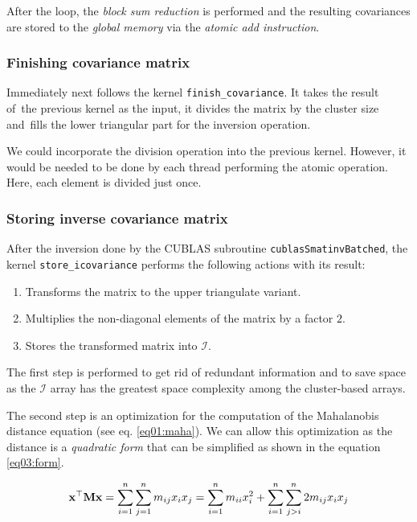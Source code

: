 After the loop, the \emph{block sum reduction} is performed and the resulting covariances are stored to the \emph{global memory} via the \emph{atomic add instruction}.

\subsubsection{Finishing covariance matrix}
Immediately next follows the kernel \texttt{finish\_covariance}. It takes the result of~the previous kernel as the input, it divides the matrix by the cluster size and~fills the lower triangular part for the inversion operation.

We could incorporate the division operation into the previous kernel. However, it would be needed to be done by each thread performing the atomic operation. Here, each element is divided just once.

\subsubsection{Storing inverse covariance matrix}
After the inversion done by the CUBLAS subroutine \texttt{cublasSmatinvBatched}, the kernel \texttt{store\_icovariance} performs the following actions with its result:
\begin{enumerate}
	\item Transforms the matrix to the upper triangulate variant.
	\item Multiplies the non-diagonal elements of the matrix by a factor $2$.
	\item Stores the transformed matrix into $\mathcal{I}$.
\end{enumerate}

The first step is performed to get rid of redundant information and to save space as the $\mathcal{I}$ array has the greatest space complexity among the cluster-based arrays.

The second step is an optimization for the computation of the Mahalanobis distance equation (see eq. \ref{eq01:maha}). We can allow this optimization as the distance is a \emph{quadratic form} that can be simplified as shown in the equation \ref{eq03:form}.

\begin{equation}
\mathbf{x}^\top\mathbf{M}\mathbf{x} = \sum_{i=1}^{n}\sum_{j=1}^{n}{m_{ij}x_ix_j} = \sum_{i=1}^{n}{m_{ii}x_i^2} + \sum_{i=1}^{n}\sum_{j>i}^{n}{2m_{ij}x_ix_j}
\label{eq03:form}
\end{equation}


